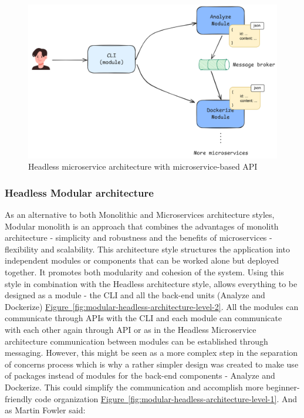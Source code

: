 \documentclass{article}
\newcommand{\FigRef}[1]{\hyperref[#1]{Figure~\ref{#1}}}
\begin{document}
\begin{multicols}{2}
\begin{figure}[H]
    \centering
    \includegraphics[width=\linewidth]{images/headless-microservice-architecture.png}
    \caption{Headless microservice architecture with microservice-based API}
    \label{fig:headless-microservice-architecture}
\end{figure}

\subsubsection{Headless Modular architecture}
As an alternative to both Monolithic and Microservices architecture styles, Modular monolith is an approach that combines the advantages of monolith architecture - simplicity and robustness and the benefits of microservices - flexibility and scalability. This architecture style structures the application into independent modules or components that can be worked alone but deployed together. It promotes both modularity and cohesion of the system. Using this style in combination with the Headless architecture style, allows everything to be designed as a module - the CLI and all the back-end units (Analyze and Dockerize) \FigRef{fig:modular-headless-architecture-level-2}. All the modules can communicate through APIs with the CLI and each module can communicate with each other again through API or as in the Headless Microservice architecture communication between modules can be established through messaging. However, this might be seen as a more complex step in the separation of concerns process which is why a rather simpler design was created to make use of packages instead of modules for the back-end components - Analyze and Dockerize. This could simplify the communication and accomplish more beginner-friendly code organization \FigRef{fig:modular-headless-architecture-level-1}.
And as Martin Fowler said: 


\end{multicols}
\end{document}
